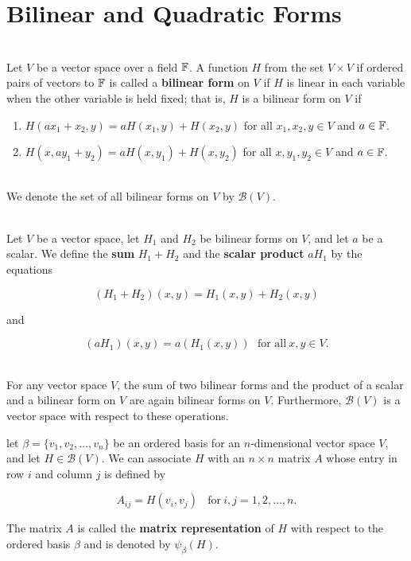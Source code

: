 \section{Bilinear and Quadratic Forms}

\begin{definition}
	\hfill\\
	Let $V$ be a vector space over a field $\mathbb{F}$. A function $H$ from the set $V \times V$ if ordered pairs of vectors to $\mathbb{F}$ is called a \textbf{bilinear form} on $V$ if $H$ is linear in each variable when the other variable is held fixed; that is, $H$ is a bilinear form on $V$ if

	\begin{enumerate}
		\item $H(ax_1 + x_2, y) = aH(x_1,y) + H(x_2,y)$ for all $x_1, x_2, y \in V$ and $a \in \mathbb{F}$.
		\item $H(x,ay_1+y_2) = aH(x,y_1) + H(x,y_2)$ for all $x,y_1,y_2 \in V$ and $a \in \mathbb{F}$.
	\end{enumerate}
\end{definition}

\begin{notation}
	\hfill\\
	We denote the set of all bilinear forms on $V$ by $\mathcal{B}(V)$.
\end{notation}

\begin{definition}
	\hfill\\
	Let $V$ be a vector space, let $H_1$ and $H_2$ be bilinear forms on $V$, and let $a$ be a scalar. We define the \textbf{sum} $H_1 + H_2$ and the \textbf{scalar product} $aH_1$ by the equations

	\[(H_1 + H_2)(x,y) = H_1(x,y) + H_2(x,y)\]

	and

	\[(aH_1)(x,y) = a(H_1(x,y))\ \ \ \text{for all}\ x,y \in V.\]
\end{definition}

\begin{theorem}
	\hfill\\
	For any vector space $V$, the sum of two bilinear forms and the product of a scalar and a bilinear form on $V$ are again bilinear forms on $V$. Furthermore, $\mathcal{B}(V)$ is a vector space with respect to these operations.
\end{theorem}

\begin{definition}
	let $\beta = \{v_1, v_2, \dots, v_n\}$ be an ordered basis for an $n$-dimensional vector space $V$, and let $H \in \mathcal{B}(V)$. We can associate $H$ with an $n \times n$ matrix $A$ whose entry in row $i$ and column $j$ is defined by

	\[A_{ij} = H(v_i, v_j)\ \ \ \ \text{for}\ i,j = 1, 2, \dots, n.\]

	The matrix $A$ is called the \textbf{matrix representation} of $H$ with respect to the ordered basis $\beta$ and is denoted by $\psi_\beta(H)$.
\end{definition}

